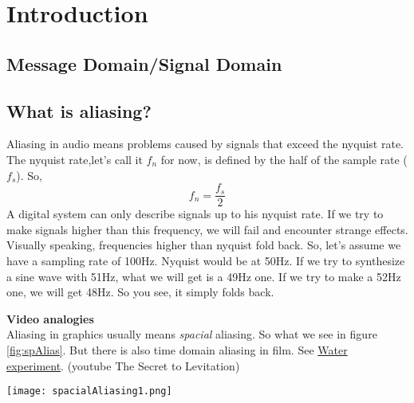 
\chapter{Introduction}
\label{introduction}

\section{Message Domain/Signal Domain}


\section{What is aliasing?}
Aliasing in audio means problems caused by signals that exceed the nyquist rate.\\
The nyquist rate,let's call it $f_n$ for now, is defined by the half of the sample rate ($f_s$). So, 
\begin{equation}
	f_n=\frac{f_s}{2}
\end{equation}
A digital system can only describe signals up to his nyquist rate. If we try to make signals higher than this frequency, we will fail and encounter strange effects.\\
Visually speaking, frequencies higher than nyquist fold back. So, let's assume we have a sampling rate of 100Hz. Nyquist would be at 50Hz. If we try to synthesize a sine wave with 51Hz, what we will get is a 49Hz one. If we try to make a 52Hz one, we will get 48Hz. So you see, it simply folds back.

\begin{framed}
	\textbf{Video analogies}\\
	Aliasing in graphics usually means \textit{spacial} aliasing. So what we see in figure \ref{fig:spAlias}. But there is also time domain aliasing in film. See \href{https://www.youtube.com/watch?v=GBtHeR-hY9Y}{Water experiment}.
(youtube \glqq{}The Secret to Levitation\grqq{})
	\begin{center}
		\texttt{[image: spacialAliasing1.png]}
		\label{fig:spAlias}
	\end{center}

\end{framed}



